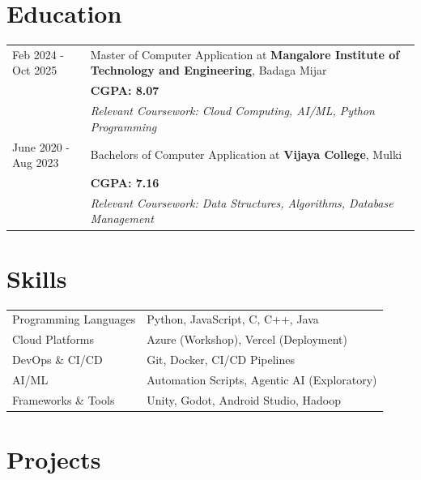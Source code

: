 \documentclass[a4paper,12pt]{article}
\begin{document}
\section{Education}
\begin{tabularx}{\linewidth}{@{}l X@{}}
Feb 2024 - Oct 2025 & Master of Computer Application at \textbf{Mangalore Institute of Technology and Engineering}, Badaga Mijar \\
& \small{\textbf{CGPA: 8.07}} \\
& \small{\textit{Relevant Coursework: Cloud Computing, AI/ML, Python Programming}} \\
June 2020 - Aug 2023 & Bachelors of Computer Application at \textbf{Vijaya College}, Mulki \\
& \small{\textbf{CGPA: 7.16}} \\
& \small{\textit{Relevant Coursework: Data Structures, Algorithms, Database Management}} \\
\end{tabularx}

\section{Skills}
\begin{tabularx}{\linewidth}{@{}l X@{}}
Programming Languages & Python, JavaScript, C, C++, Java \\
Cloud Platforms & Azure (Workshop), Vercel (Deployment) \\
DevOps \& CI/CD & Git, Docker, CI/CD Pipelines \\
AI/ML & Automation Scripts, Agentic AI (Exploratory) \\
Frameworks \& Tools & Unity, Godot, Android Studio, Hadoop \\
\end{tabularx}

\section{Projects}
\end{document}

